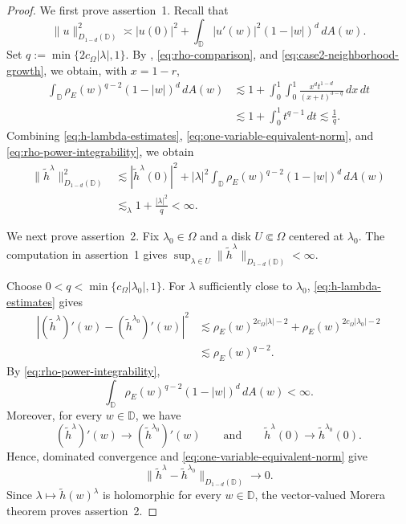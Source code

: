 \documentclass[a4paper,12pt]{amsart}
\theoremstyle{definition}
\begin{document}
\begin{proof}
We first prove assertion~1. Recall that
\begin{equation}
    \|u\|_{D_{1-d}(\mathbb D)}^2
    \asymp
    |u(0)|^2+
    \int_{\mathbb D}|u'(w)|^2(1-|w|)^d\,dA(w).
    \label{eq:one-variable-equivalent-norm}
\end{equation}
Set $q:=\min\{2c_\Omega|\lambda|,1\}$. By
\cite[Exercise~9.4.1]{ElFallah2014_book},
\eqref{eq:rho-comparison}, and
\eqref{eq:case2-neighborhood-growth}, we obtain, with $x=1-r$,
\begin{equation}
\begin{aligned}
    \int_{\mathbb D}
    \rho_E(w)^{q-2}(1-|w|)^d\,dA(w)
    &\lesssim
    1+\int_0^1\int_0^1
    \frac{x^dt^{1-d}}{(x+t)^{3-q}}\,dx\,dt\\
    &\lesssim
    1+\int_0^1t^{q-1}\,dt
    \lesssim\frac1q.
\end{aligned}
\label{eq:rho-power-integrability}
\end{equation}
Combining \eqref{eq:h-lambda-estimates},
\eqref{eq:one-variable-equivalent-norm}, and
\eqref{eq:rho-power-integrability}, we obtain
\[
\begin{aligned}
    \|\widetilde h^\lambda\|_{D_{1-d}(\mathbb D)}^2
    &\lesssim
    |\widetilde h^\lambda(0)|^2
    +|\lambda|^2
    \int_{\mathbb D}
    \rho_E(w)^{q-2}(1-|w|)^d\,dA(w)\\
    &\lesssim_\lambda
    1+\frac{|\lambda|^2}{q}
    <\infty.
\end{aligned}
\]

We next prove assertion~2. Fix $\lambda_0\in\Omega$ and a disk
$U\Subset\Omega$ centered at $\lambda_0$. The computation in
assertion~1 gives
$
    \sup_{\lambda\in U}
    \|\widetilde h^\lambda\|_{D_{1-d}(\mathbb D)}
    <\infty.
$

Choose $0<q<\min\{c_\Omega|\lambda_0|,1\}$. For $\lambda$ sufficiently
close to $\lambda_0$, \eqref{eq:h-lambda-estimates} gives
\[
\begin{aligned}
    |(\widetilde h^\lambda)'(w)
      -(\widetilde h^{\lambda_0})'(w)|^2
    &\lesssim
    \rho_E(w)^{2c_\Omega|\lambda|-2}
    +\rho_E(w)^{2c_\Omega|\lambda_0|-2}\\
    &\lesssim \rho_E(w)^{q-2}.
\end{aligned}
\]
By \eqref{eq:rho-power-integrability},
\[
    \int_{\mathbb D}
        \rho_E(w)^{q-2}(1-|w|)^d\,dA(w)<\infty.
\]
Moreover, for every $w\in\mathbb D$, we have
\begin{equation*}
    (\widetilde h^\lambda)'(w)
    \longrightarrow
    (\widetilde h^{\lambda_0})'(w)
    \qquad\text{and}\qquad
    \widetilde h^\lambda(0)
    \longrightarrow
    \widetilde h^{\lambda_0}(0).
\end{equation*}
Hence, dominated convergence and
\eqref{eq:one-variable-equivalent-norm} give
\[
    \|\widetilde h^\lambda-\widetilde h^{\lambda_0}\|
        _{D_{1-d}(\mathbb D)}
    \longrightarrow0.
\]
Since $\lambda\mapsto\widetilde h(w)^\lambda$ is holomorphic for
every $w\in\mathbb D$, the vector-valued Morera theorem
\cite[Chapter~3, Exercise~26(b), p.~89]{Rudin1991}
proves assertion~2.


\end{proof}
\end{document}

